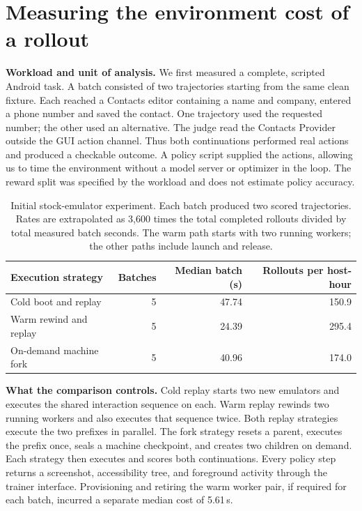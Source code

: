 \documentclass[11pt,letterpaper]{article}
\newcommand{\subhead}[1]{\par\smallskip\noindent\textbf{#1}\enspace}
\begin{document}
\clearpage
\section{Measuring the environment cost of a rollout}
\subhead{Workload and unit of analysis.}
We first measured a complete, scripted Android task. A batch consisted of two trajectories starting from the same clean fixture. Each reached a Contacts editor containing a name and company, entered a phone number and saved the contact. One trajectory used the requested number; the other used an alternative. The judge read the Contacts Provider outside the GUI action channel. Thus both continuations performed real actions and produced a checkable outcome. A policy script supplied the actions, allowing us to time the environment without a model server or optimizer in the loop. The reward split was specified by the workload and does not estimate policy accuracy.

\begin{table}[h]
\centering\small
\begin{tabular}{@{}lrrr@{}}\toprule
Execution strategy & Batches & Median batch (s) & Rollouts per host-hour\\ \midrule
Cold boot and replay & 5 & 47.74 & 150.9\\
Warm rewind and replay & 5 & 24.39 & 295.4\\
On-demand machine fork & 5 & 40.96 & 174.0\\ \bottomrule
\end{tabular}
\caption{Initial stock-emulator experiment. Each batch produced two scored trajectories. Rates are extrapolated as 3,600 times the total completed rollouts divided by total measured batch seconds. The warm path starts with two running workers; the other paths include launch and release.}\label{tab:batch}
\end{table}

\subhead{What the comparison controls.}
Cold replay starts two new emulators and executes the shared interaction sequence on each. Warm replay rewinds two running workers and also executes that sequence twice. Both replay strategies execute the two prefixes in parallel. The fork strategy resets a parent, executes the prefix once, seals a machine checkpoint, and creates two children on demand. Each strategy then executes and scores both continuations. Every policy step returns a screenshot, accessibility tree, and foreground activity through the trainer interface. Provisioning and retiring the warm worker pair, if required for each batch, incurred a separate median cost of 5.61\,s.
\end{document}
